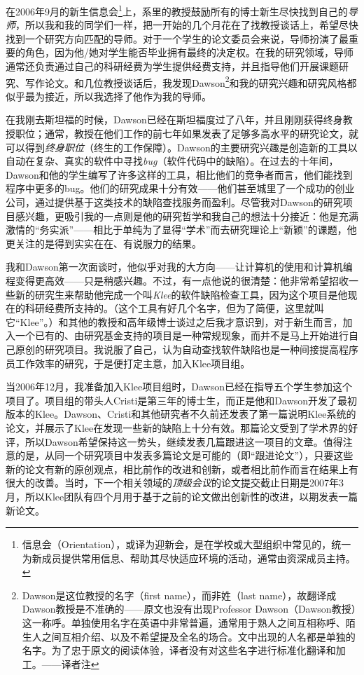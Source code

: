 \documentclass[letter,12pt]{book}
\begin{document}
\begin{CJK}{UTF8}{gbsn}
在2006年9月的新生信息会\footnote{信息会（Orientation），或译为迎新会，是在学校或大型组织中常见的，统一为新成员提供常用信息、帮助其尽快适应环境的活动，通常由资深成员主持。}上，系里的教授鼓励所有的博士新生尽快找到自己的\emph{导师}，所以我和我的同学们一样，把一开始的几个月花在了找教授谈话上，希望尽快找到一个研究方向匹配的导师。对于一个学生的论文委员会来说，导师扮演了最重要的角色，因为他/她对学生能否毕业拥有最终的决定权。在我的研究领域，导师通常还负责通过自己的科研经费为学生提供经费支持，并且指导他们开展课题研究、写作论文。和几位教授谈话后，我发现Dawson\footnote{Dawson是这位教授的名字（first name），而非姓（last name），故翻译成Dawson教授是不准确的——原文也没有出现Professor Dawson（Dawson教授）这一称呼。单独使用名字在英语中非常普遍，通常用于熟人之间互相称呼、陌生人之间互相介绍、以及不希望提及全名的场合。文中出现的人名都是单独的名字。为了忠于原文的阅读体验，译者没有对这些名字进行标准化翻译和加工。——译者注}和我的研究兴趣和研究风格都似乎最为接近，所以我选择了他作为我的导师。

在我刚去斯坦福的时候，Dawson已经在斯坦福度过了八年，并且刚刚获得终身教授职位；通常，教授在他们工作的前七年如果发表了足够多高水平的研究论文，就可以得到\emph{终身职位}（终生的工作保障）。Dawson的主要研究兴趣是创造新的工具以自动在复杂、真实的软件中寻找\emph{bug}（软件代码中的缺陷）。在过去的十年间，Dawson和他的学生编写了许多这样的工具，相比他们的竞争者而言，他们能找到程序中更多的bug。他们的研究成果十分有效——他们甚至城里了一个成功的创业公司，通过提供基于这类技术的缺陷查找服务而盈利。尽管我对Dawson的研究项目感兴趣，更吸引我的一点则是他的研究哲学和我自己的想法十分接近：他是充满激情的“务实派”——相比于单纯为了显得“学术”而去研究理论上“新颖”的课题，他更关注的是得到实实在在、有说服力的结果。

我和Dawson第一次面谈时，他似乎对我的大方向——让计算机的使用和计算机编程变得更高效——只是稍感兴趣。不过，有一点他说的很清楚：他非常希望招收一些新的研究生来帮助他完成一个叫\emph{Klee}的软件缺陷检查工具，因为这个项目是他现在的科研经费所支持的。（这个工具有好几个名字，但为了简便，这里就叫它“Klee”。）和其他的教授和高年级博士谈过之后我才意识到，对于新生而言，加入一个已有的、由研究基金支持的项目是一种常规现象，而并不是马上开始进行自己原创的研究项目。我说服了自己，认为自动查找软件缺陷也是一种间接提高程序员工作效率的研究，于是便打定主意，加入Klee项目组。

当2006年12月，我准备加入Klee项目组时，Dawson已经在指导五个学生参加这个项目了。项目组的带头人Cristi是第三年的博士生，而正是他和Dawson开发了最初版本的Klee。Dawson、Cristi和其他研究者不久前还发表了第一篇说明Klee系统的论文，并展示了Klee在发现一些新的缺陷上十分有效。那篇论文受到了学术界的好评，所以Dawson希望保持这一势头，继续发表几篇跟进这一项目的文章。值得注意的是，从同一个研究项目中发表多篇论文是可能的（即“跟进论文”），只要这些新的论文有新的原创观点，相比前作的改进和创新，或者相比前作而言在结果上有很大的改善。当时，下一个相关领域的\emph{顶级会议}的论文提交截止日期是2007年3月，所以Klee团队有四个月用于基于之前的论文做出创新性的改进，以期发表一篇新论文。


\end{CJK}
\end{document}

